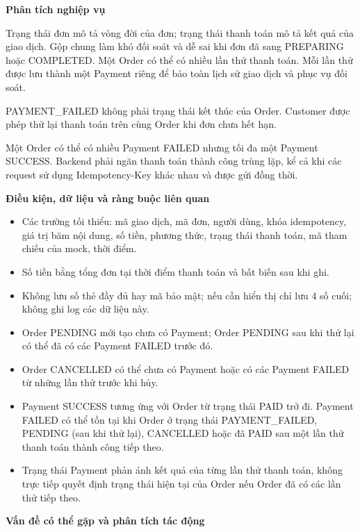 \documentclass[11pt,a4paper,oneside]{report}
\begin{document}
\textbf{Phân tích nghiệp vụ}

Trạng thái đơn mô tả vòng đời của đơn; trạng thái thanh toán mô tả kết quả của giao dịch. Gộp chung làm khó đối soát và dễ sai khi đơn đã sang PREPARING hoặc COMPLETED. Một Order có thể có nhiều lần thử thanh toán. Mỗi lần thử được lưu thành một Payment riêng để bảo toàn lịch sử giao dịch và phục vụ đối soát.

PAYMENT\_FAILED không phải trạng thái kết thúc của Order. Customer được phép thử lại thanh toán trên cùng Order khi đơn chưa hết hạn.

Một Order có thể có nhiều Payment FAILED nhưng tối đa một Payment SUCCESS. Backend phải ngăn thanh toán thành công trùng lặp, kể cả khi các request sử dụng Idempotency-Key khác nhau và được gửi đồng thời.

\textbf{Điều kiện, dữ liệu và ràng buộc liên quan}

\begin{itemize}
\item
  Các trường tối thiểu: mã giao dịch, mã đơn, người dùng, khóa idempotency, giá trị băm nội dung, số tiền, phương thức, trạng thái thanh toán, mã tham chiếu của mock, thời điểm.
\item
  Số tiền bằng tổng đơn tại thời điểm thanh toán và bất biến sau khi ghi.
\item
  Không lưu số thẻ đầy đủ hay mã bảo mật; nếu cần hiển thị chỉ lưu 4 số cuối; không ghi log các dữ liệu này.
\item
  Order PENDING mới tạo chưa có Payment; Order PENDING sau khi thử lại có thể đã có các Payment FAILED trước đó.
\item
  Order CANCELLED có thể chưa có Payment hoặc có các Payment FAILED từ những lần thử trước khi hủy.
\item
  Payment SUCCESS tương ứng với Order từ trạng thái PAID trở đi. Payment FAILED có thể tồn tại khi Order ở trạng thái PAYMENT\_FAILED, PENDING (sau khi thử lại), CANCELLED hoặc đã PAID sau một lần thử thanh toán thành công tiếp theo.
\item
  Trạng thái Payment phản ánh kết quả của từng lần thử thanh toán, không trực tiếp quyết định trạng thái hiện tại của Order nếu Order đã có các lần thử tiếp theo.
\end{itemize}

\textbf{Vấn đề có thể gặp và phân tích tác động}
\end{document}
